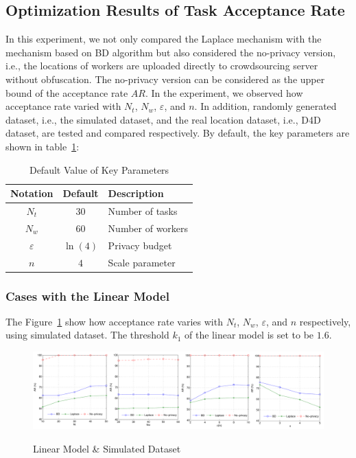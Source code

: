\subsection{Optimization Results of Task Acceptance Rate} %
In this experiment, we not only compared the Laplace mechanism with the mechanism based on BD algorithm but also considered the no-privacy version, i.e., the locations of workers are uploaded directly to crowdsourcing server without obfuscation. The no-privacy version can be considered as the upper bound of the acceptance rate $AR$. In the experiment, we observed how acceptance rate varied with $N_t$, $N_w$, $\varepsilon$, and $n$. In addition, randomly generated dataset, i.e., the simulated dataset, and the real location dataset, i.e., D4D dataset, are tested and compared respectively. By default, the key parameters are shown in table~\ref{tab:deft}:
\begin{table}
  \caption{Default Value of Key Parameters}
  \label{tab:deft}
  \begin{tabular}{ccl}
    \toprule
    Notation & Default & Description\\
    \midrule
    $N_t$ & $30$ & Number of tasks\\
    $N_w$ & $60$ & Number of workers\\
    $\varepsilon$ & $\ln (4)$ & Privacy budget\\
    $n$ & $4$ & Scale parameter\\
  \bottomrule
\end{tabular}
\end{table}

\subsubsection{Cases with the Linear Model}
The Figure~\ref{img:LinSim} show how acceptance rate varies with $N_t$, $N_w$, $\varepsilon$, and $n$ respectively, using simulated dataset. The threshold $k_1$ of the linear model is set to be $1.6$.

\begin{figure}
\includegraphics[width=1\textwidth]{LinSim}
\label{img:LinSim}
\caption{Linear Model \& Simulated Dataset}
\end{figure}

